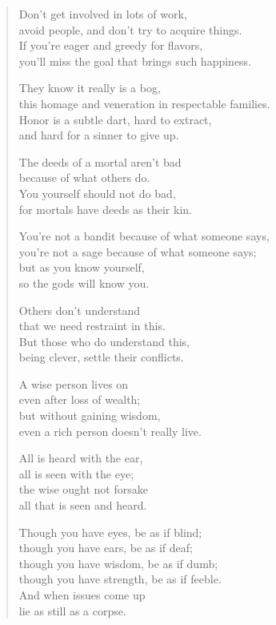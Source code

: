 \documentclass[12pt,openany]{book}%
\begin{document}
\begin{verse}%
Don’t get involved in lots of work, \\
avoid people, and don’t try to acquire things. \\
If you’re eager and greedy for flavors, \\
you’ll miss the goal that brings such happiness. 

They know it really is a bog, \\
this homage and veneration in respectable families. \\
Honor is a subtle dart, hard to extract, \\
and hard for a sinner to give up. 

The deeds of a mortal aren’t bad \\
because of what others do. \\
You yourself should not do bad, \\
for mortals have deeds as their kin. 

You’re not a bandit because of what someone says, \\
you’re not a sage because of what someone says; \\
but as you know yourself, \\
so the gods will know you. 

Others don’t understand \\
that we need restraint in this. \\
But those who do understand this, \\
being clever, settle their conflicts. 

A wise person lives on \\
even after loss of wealth; \\
but without gaining wisdom, \\
even a rich person doesn’t really live. 

All is heard with the ear, \\
all is seen with the eye; \\
the wise ought not forsake \\
all that is seen and heard. 

Though you have eyes, be as if blind; \\
though you have ears, be as if deaf; \\
though you have wisdom, be as if dumb; \\
though you have strength, be as if feeble. \\
And when issues come up \\
lie as still as a corpse. 

%
\end{verse}
\end{document}
